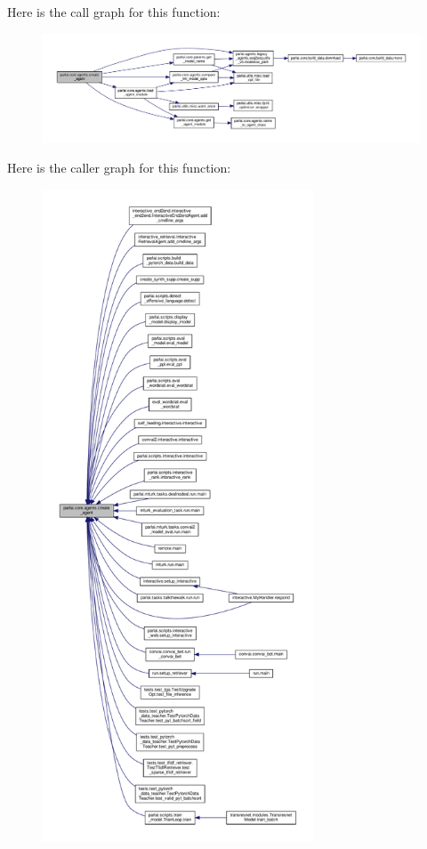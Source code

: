Here is the call graph for this function\+:
\nopagebreak
\begin{figure}[H]
\begin{center}
\leavevmode
\includegraphics[width=350pt]{namespaceparlai_1_1core_1_1agents_ad0d54074d4bcc148bb415ab5515a53b5_cgraph}
\end{center}
\end{figure}
Here is the caller graph for this function\+:
\nopagebreak
\begin{figure}[H]
\begin{center}
\leavevmode
\includegraphics[height=550pt]{namespaceparlai_1_1core_1_1agents_ad0d54074d4bcc148bb415ab5515a53b5_icgraph}
\end{center}
\end{figure}
\mbox{\label{namespaceparlai_1_1core_1_1agents_aa5af5dd1d2f9da491b60348d479b849f}} 
